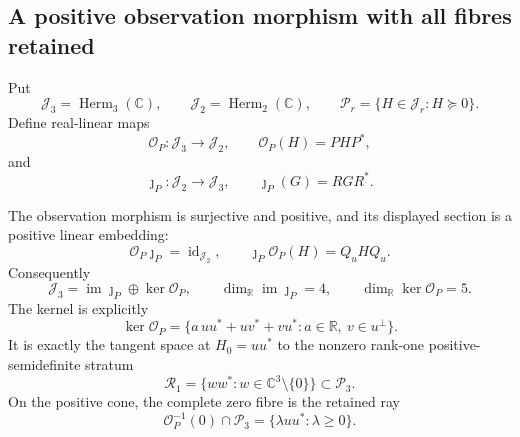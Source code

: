 \subsection{A positive observation morphism with all fibres retained}
\label{hlob:subsec:observation}

Put
\[
 \mathcal J_3=\operatorname{Herm}_3(\mathbb C),\qquad
 \mathcal J_2=\operatorname{Herm}_2(\mathbb C),\qquad
 \mathcal P_r=\{H\in\mathcal J_r:H\succeq0\}.
\]
Define real-linear maps
\begin{equation}
 \mathcal O_P:\mathcal J_3\longrightarrow\mathcal J_2,
 \qquad \mathcal O_P(H)=PHP^*,
 \label{hlob:eq:observation}
\end{equation}
and
\begin{equation}
 \jmath_P:\mathcal J_2\longrightarrow\mathcal J_3,
 \qquad \jmath_P(G)=RGR^*.
 \label{hlob:eq:section}
\end{equation}

\begin{theorem}
\label{hlob:thm:split-observation}
The observation morphism is surjective and positive, and its displayed
section is a positive linear embedding:
\begin{equation}
 \mathcal O_P\jmath_P=\operatorname{id}_{\mathcal J_2},
 \qquad
 \jmath_P\mathcal O_P(H)=Q_uHQ_u.
 \label{hlob:eq:split-observation}
\end{equation}
Consequently
\begin{equation}
 \mathcal J_3
 =\operatorname{im}\jmath_P\oplus\ker\mathcal O_P,
 \qquad
 \dim_{\mathbb R}\operatorname{im}\jmath_P=4,
 \qquad
 \dim_{\mathbb R}\ker\mathcal O_P=5.
 \label{hlob:eq:dimension-split}
\end{equation}
The kernel is explicitly
\begin{equation}
 \ker\mathcal O_P
 =\{a\,uu^*+uv^*+vu^*:a\in\mathbb R,\ v\in u^\perp\}.
 \label{hlob:eq:linear-kernel}
\end{equation}
It is exactly the tangent space at \(H_0=uu^*\) to the nonzero rank-one
positive-semidefinite stratum
\begin{equation}
 \mathcal R_1=\{ww^*:w\in\mathbb C^3\setminus\{0\}\}
 \subset\mathcal P_3.
 \label{hlob:eq:rank-one-stratum}
\end{equation}
On the positive cone, the complete zero fibre is the retained ray
\begin{equation}
 \mathcal O_P^{-1}(0)\cap\mathcal P_3
 =\{\lambda uu^*: \lambda\geq0\}.
 \label{hlob:eq:positive-zero-fibre}
\end{equation}
\end{theorem}

